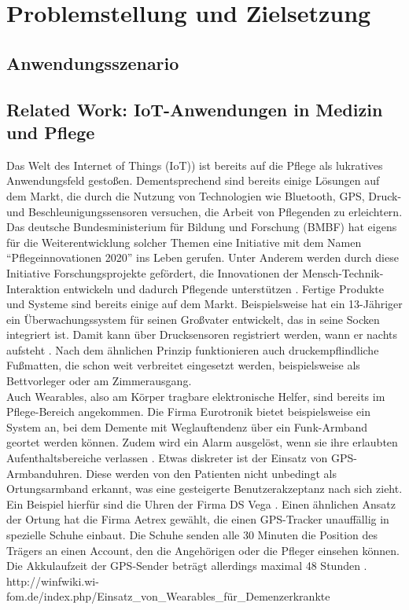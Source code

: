 \section{Problemstellung und Zielsetzung}\label{sec:definitionen}

\subsection{Anwendungsszenario}

\subsection{Related Work: IoT-Anwendungen in Medizin und Pflege}\label{ssec:rel.work}
Das Welt des Internet of Things (IoT)) ist bereits auf die Pflege als lukratives Anwendungsfeld gestoßen.
 Dementsprechend sind bereits einige Lösungen auf dem Markt, die durch die Nutzung von Technologien wie Bluetooth, GPS, Druck- und Beschleunigungssensoren versuchen, die Arbeit von Pflegenden zu erleichtern.
Das deutsche Bundesministerium für Bildung und Forschung (BMBF) hat eigens für die Weiterentwicklung solcher Themen eine Initiative mit dem Namen \enquote{Pflegeinnovationen 2020} ins Leben gerufen. Unter Anderem werden durch diese Initiative Forschungsprojekte gefördert, die Innovationen der Mensch-Technik-Interaktion entwickeln und dadurch Pflegende unterstützen \citep[Vgl.][]{bmbf}. Fertige Produkte und Systeme sind bereits einige auf dem Markt.
Beispielsweise hat ein 13-Jähriger ein Überwachungssystem für seinen Großvater entwickelt, das in seine Socken integriert ist. Damit kann über Drucksensoren registriert werden, wann er nachts aufsteht \citep[Vgl.][]{spiegel-alzheimer}. Nach dem ähnlichen Prinzip funktionieren auch druckempflindliche Fußmatten, die schon weit verbreitet eingesetzt werden, beispielsweise als Bettvorleger oder am Zimmerausgang.\\
Auch Wearables, also am Körper tragbare elektronische Helfer, sind bereits im Pflege-Bereich angekommen. Die Firma Eurotronik bietet beispielsweise ein System an, bei dem Demente mit Weglauftendenz über ein Funk-Armband geortet werden können. Zudem wird ein Alarm ausgelöst, wenn sie ihre erlaubten Aufenthaltsbereiche verlassen \citep[Vgl.][]{eurotronik}. Etwas diskreter ist der Einsatz von GPS-Armbanduhren. Diese werden von den Patienten nicht unbedingt als Ortungsarmband erkannt, was eine gesteigerte Benutzerakzeptanz nach sich zieht. Ein Beispiel hierfür sind die Uhren der Firma DS Vega \citep[Vgl.][]{ds-vega}.
Einen ähnlichen Ansatz der Ortung hat die Firma Aetrex gewählt, die einen GPS-Tracker unauffällig in spezielle Schuhe einbaut. Die Schuhe senden alle 30 Minuten die Position des Trägers an einen Account, den die Angehörigen oder die Pfleger einsehen können. Die Akkulaufzeit der GPS-Sender beträgt allerdings maximal 48 Stunden \citep[Vgl.][]{aetrex}.
http://winfwiki.wi-fom.de/index.php/Einsatz\_von\_Wearables\_für\_Demenzerkrankte\\



